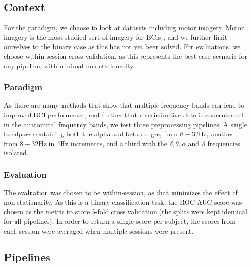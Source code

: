 \subsection{Context}
For the paradigm, we choose to look at datasets including motor
imagery.  Motor imagery is the most-studied sort of imagery for BCIs
\cite{Yuan2014}, and we further limit ourselves to the binary case as
this has not yet been solved. For evaluations, we choose
within-session cross-validation, as this represents the best-case
scenario for any pipeline, with minimal non-stationarity. 

\subsubsection{Paradigm}
As there are many methods that show that multiple frequency bands can
lead to improved BCI performance\cite{KaiKengAng2008}, and further
that discriminative data is concentrated in the anatomical frequency
bands, we test three preprocessing pipelines: A single bandpass
containing both the alpha and beta ranges, from $8-32\text{Hz}$,
another from $8-32\text{Hz}$ in 4Hz increments, and a third with the
$\delta, \theta, \alpha$ and $\beta$ frequencies isolated.

\subsubsection{Evaluation}
The evaluation was chosen to be within-session, as that minimizes the
effect of non-stationarity. As this is a binary classification task,
the ROC-AUC score was chosen as the metric to score 5-fold cross
validation (the splits were kept identical for all pipelines). In
order to return a single score per subject, the scores from each
session were averaged when multiple sessions were present.

\subsection{Pipelines}

